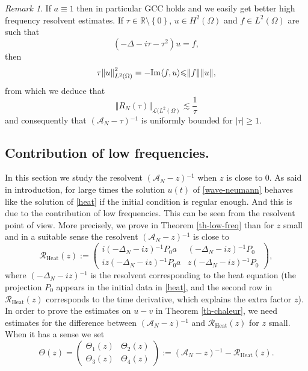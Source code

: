 \documentclass[10pt, a4paper,reqno]{amsart}
\theoremstyle{plain}
\theoremstyle{definition}
\theoremstyle{remark}
\newtheorem{remark}[theorem]{Remark}
\begin{document}
\begin{remark} \label{rem-triv-high-freq}
If $a \equiv 1$ then in particular GCC holds and we easily get better high frequency resolvent estimates. If ${\tau} \in {\mathbb{R}} \setminus {\left\{ 0 \right\}}$, $u \in H^2({\Omega})$ and $f \in L^2({\Omega})$ are such that 
\[
(-{\Delta} -i{\tau} - {\tau}^2) u = f,
\]
then
\[
{\tau} {\left\Vert {u}\right\Vert}_{L^2({\Omega})}^2 = - {\mathop{\rm{Im}}\nolimits} {\left< {f} , {u} \right>} {\leqslant} {\left\Vert f\right\Vert} {\left\Vert u\right\Vert},
\]
from which we deduce that 
\[
{\left\Vert {R_N({\tau})}\right\Vert}_{{{\mathcal L}}(L^2({\Omega})} \lesssim \frac 1 {\tau}
\]
and consequently that $({{{\mathcal A}}_N}-{\tau}){^{-1}}$ is uniformly bounded for ${\left\vert {\tau}\right\vert} {\geqslant} 1$.
\end{remark}

\subsection{Contribution of low frequencies.} \label{sec-low-freq}

In this section we study the resolvent $({{{\mathcal A}}_N}-z){^{-1}}$ when $z$ is close to 0. As said in introduction, for large times the solution $u(t)$ of \eqref{wave-neumann} behaves like the solution of \eqref{heat} if the initial condition is regular enough. And this is due to the contribution of low frequencies.
This can be seen from the resolvent point of view. More precisely, we prove in Theorem \ref{th-low-freq} than for $z$ small and in a suitable sense the resolvent $({{{\mathcal A}}_N}-z){^{-1}}$ is close to
\begin{equation} \label{def-RcC}
{{{\mathcal R}}_{\textrm{Heat}}(z)} := 
\begin{pmatrix}
i {{(-{{\Delta}_N} -iz){^{-1}}}} P_0 a & {{(-{{\Delta}_N} -iz){^{-1}}}} P_0 \\
iz {{(-{{\Delta}_N} -iz){^{-1}}}} P_0 a & z{{(-{{\Delta}_N} -iz){^{-1}}}} P_0
\end{pmatrix},
\end{equation}
where ${{(-{{\Delta}_N} -iz){^{-1}}}}$ is the resolvent corresponding to the heat equation (the projection $P_0$ appears in the initial data in \eqref{heat}, and the second row in ${{{\mathcal R}}_{\textrm{Heat}}(z)}$ corresponds to the time derivative, which explains the extra factor $z$).\\

In order to prove the estimates on $u-v$ in Theorem \ref{th-chaleur}, we need estimates for the difference between $({{{\mathcal A}}_N}-z){^{-1}}$ and ${{{\mathcal R}}_{\textrm{Heat}}(z)}$ for $z$ small. When it has a sense we set 
\begin{equation} \label{def-Th}
{\Theta}(z)  = 
\begin{pmatrix}
{\Theta}_1(z) & {\Theta}_2(z) \\
{\Theta}_3(z) & {\Theta}_4(z)
\end{pmatrix}
:= ({{{\mathcal A}}_N}-z){^{-1}} - {{{\mathcal R}}_{\textrm{Heat}}(z)}.
\end{equation}
\end{document}
